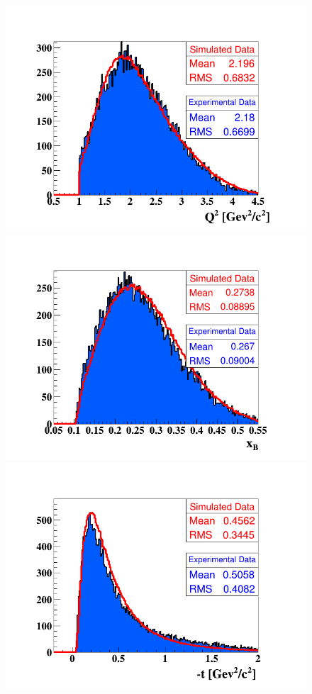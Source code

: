 \begin{figure}[h!]
\includegraphics[scale=0.35]{fig_dvcs/comp/Q2_InCoh.png}
\includegraphics[scale=0.35]{fig_dvcs/comp/xB_InCoh.png}
\includegraphics[scale=0.35]{fig_dvcs/comp/t_InCoh.png}

\end{figure}
